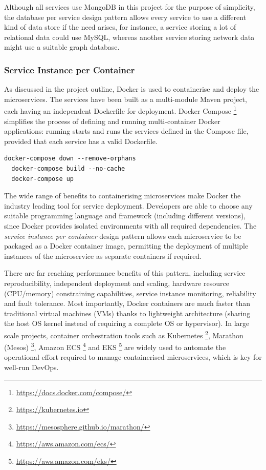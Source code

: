 Although all services use MongoDB in this project for the purpose of simplicity, the database per service design pattern allows every service to use a different kind of data store if the need arises, for instance, a service storing a lot of relational data could use MySQL, whereas another service storing network data might use a suitable graph database.

\subsubsection{Service Instance per Container}

As discussed in the project outline, Docker is used to containerise and deploy the microservices. The services have been built as a multi-module Maven project, each having an independent Dockerfile for deployment. Docker Compose \footnote{\url{https://docs.docker.com/compose/}} simplifies the process of defining and running multi-container Docker applications: running  starts and runs the services defined in the Compose file, provided that each service has a valid Dockerfile.

\begin{lstlisting}[caption=Sample Docker Compose commands to start the microservices]
  docker-compose down --remove-orphans
  docker-compose build --no-cache
  docker-compose up
\end{lstlisting}

The wide range of benefits to containerising microservices make Docker the industry leading tool for service deployment. Developers are able to choose any suitable programming language and framework (including different versions), since Docker provides isolated environments with all required dependencies. The \textit{service instance per container} design pattern allows each microservice to be packaged as a Docker container image, permitting the deployment of multiple instances of the microservice as separate containers if required.

There are far reaching performance benefits of this pattern, including service reproducibility, independent deployment and scaling, hardware resource (CPU/memory) constraining capabilities, service instance monitoring, reliability and fault tolerance. Most importantly, Docker containers are much faster than traditional virtual machines (VMs) thanks to lightweight architecture (sharing the host OS kernel instead of requiring a complete OS or hypervisor). In large scale projects, container orchestration tools such as Kubernetes \footnote{\url{https://kubernetes.io}}, Marathon (Mesos) \footnote{\url{https://mesosphere.github.io/marathon/}}, Amazon ECS \footnote{\url{https://aws.amazon.com/ecs/}} and EKS \footnote{\url{https://aws.amazon.com/eks/}} are widely used to automate the operational effort required to manage containerised microservices, which is key for well-run DevOps.

